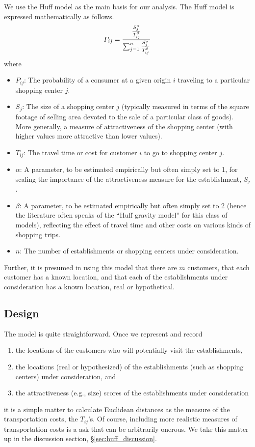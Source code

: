 We use the Huff model as the main basis for our analysis.
The Huff model is expressed mathematically as follows.
\begin{equation}
P_{ij} = \frac{\frac{S_j^{\alpha}}{T_{ij}^{\beta}}}{\sum_{j=1}^n\frac{S_j^{\alpha}}{T_{ij}^{\beta}}}\label{exp:huff}\index{Huff model}
\end{equation}
where
\begin{itemize}
\item $P_{ij}$: The probability of a consumer at a given origin $i$ traveling to a particular shopping center $j$.
\item $S_j$: The size of a shopping center $j$ (typically measured in terms of the square footage of selling area devoted to the sale of a particular class of goods). More generally, a measure of attractiveness of the shopping center (with higher values more attractive than lower values).
\item $T_{ij}$: The travel time or cost for customer  $i$ to go to shopping center $j$.
\item $\alpha$: A parameter, to be estimated empirically but often simply set to 1, for scaling the importance of the attractiveness measure for the establishment, $S_j$.
\item $\beta$: A parameter, to be estimated empirically but often simply set to 2 (hence the literature often speaks of the  ``Huff gravity model'' for this class of models), reflecting the effect of travel time and other costs on various kinds of shopping trips.
\item $n$:  The number of establishments or shopping centers under consideration.
\end{itemize}

Further, it is presumed in using this model that there are $m$ customers, that each customer has a known location, and that each of the establishments under consideration has a known location, real or hypothetical.




\subsection{Design}

The model is quite straightforward. Once we represent and record 
\begin{enumerate}
\item the locations of the customers who will potentially visit the establishments,
\item  the locations (real or hypothesized) of the establishments (such as shopping centers) under consideration, and
\item the attractiveness (e.g., size) scores of the establishments under consideration
\end{enumerate}
it is a simple matter to calculate Euclidean distances as the measure of the transportation costs, the $T_{ij}$'s.  Of course, including more realistic measures of transportation costs is a ask that can be arbitrarily onerous. We take this matter up in the discussion section, \S\ref{sec:huff_discussion}.

